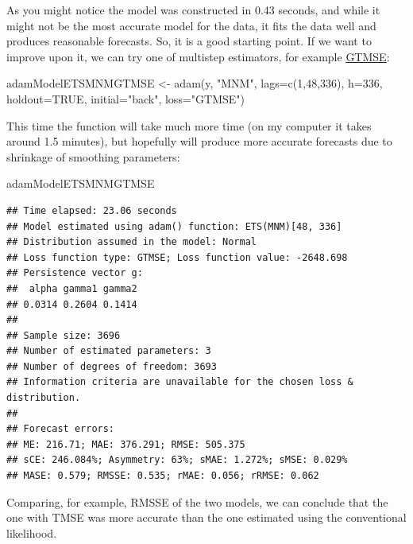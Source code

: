 \documentclass[
]{book}
\newenvironment{Shaded}{\begin{snugshade}}{\end{snugshade}}
\newcommand{\AttributeTok}[1]{\textcolor[rgb]{0.77,0.63,0.00}{#1}}
\newcommand{\ConstantTok}[1]{\textcolor[rgb]{0.00,0.00,0.00}{#1}}
\newcommand{\DecValTok}[1]{\textcolor[rgb]{0.00,0.00,0.81}{#1}}
\newcommand{\FunctionTok}[1]{\textcolor[rgb]{0.00,0.00,0.00}{#1}}
\newcommand{\NormalTok}[1]{#1}
\newcommand{\OtherTok}[1]{\textcolor[rgb]{0.56,0.35,0.01}{#1}}
\newcommand{\StringTok}[1]{\textcolor[rgb]{0.31,0.60,0.02}{#1}}
\theoremstyle{definition}
\theoremstyle{definition}
\theoremstyle{definition}
\theoremstyle{definition}
\theoremstyle{remark}
\begin{document}
As you might notice the model was constructed in 0.43 seconds, and while it might not be the most accurate model for the data, it fits the data well and produces reasonable forecasts. So, it is a good starting point. If we want to improve upon it, we can try one of multistep estimators, for example \protect\hyperlink{multistepLossesGTMSE}{GTMSE}:

\begin{Shaded}
\begin{Highlighting}[]
\NormalTok{adamModelETSMNMGTMSE }\OtherTok{\textless{}{-}} \FunctionTok{adam}\NormalTok{(y, }\StringTok{"MNM"}\NormalTok{, }\AttributeTok{lags=}\FunctionTok{c}\NormalTok{(}\DecValTok{1}\NormalTok{,}\DecValTok{48}\NormalTok{,}\DecValTok{336}\NormalTok{),}
                             \AttributeTok{h=}\DecValTok{336}\NormalTok{, }\AttributeTok{holdout=}\ConstantTok{TRUE}\NormalTok{,}
                             \AttributeTok{initial=}\StringTok{"back"}\NormalTok{, }\AttributeTok{loss=}\StringTok{"GTMSE"}\NormalTok{)}
\end{Highlighting}
\end{Shaded}

This time the function will take much more time (on my computer it takes around 1.5 minutes), but hopefully will produce more accurate forecasts due to shrinkage of smoothing parameters:

\begin{Shaded}
\begin{Highlighting}[]
\NormalTok{adamModelETSMNMGTMSE}
\end{Highlighting}
\end{Shaded}

\begin{verbatim}
## Time elapsed: 23.06 seconds
## Model estimated using adam() function: ETS(MNM)[48, 336]
## Distribution assumed in the model: Normal
## Loss function type: GTMSE; Loss function value: -2648.698
## Persistence vector g:
##  alpha gamma1 gamma2 
## 0.0314 0.2604 0.1414 
## 
## Sample size: 3696
## Number of estimated parameters: 3
## Number of degrees of freedom: 3693
## Information criteria are unavailable for the chosen loss & distribution.
## 
## Forecast errors:
## ME: 216.71; MAE: 376.291; RMSE: 505.375
## sCE: 246.084%; Asymmetry: 63%; sMAE: 1.272%; sMSE: 0.029%
## MASE: 0.579; RMSSE: 0.535; rMAE: 0.056; rRMSE: 0.062
\end{verbatim}

Comparing, for example, RMSSE of the two models, we can conclude that the one with TMSE was more accurate than the one estimated using the conventional likelihood.
\end{document}
